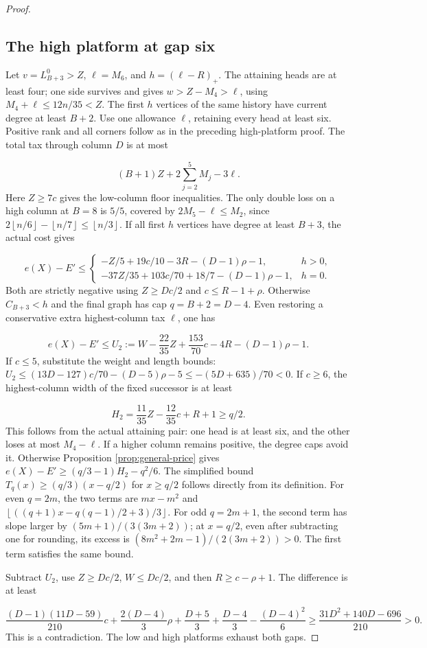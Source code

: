 \documentclass[11pt,a4paper]{article}
\newcommand{\floor}[1]{\left\lfloor#1\right\rfloor}
\theoremstyle{definition}
\begin{document}
\begin{proof}
\subsection*{The high platform at gap six}
Let $v=L_{B+3}^0>Z$, $\ell=M_6$, and $h=(\ell-R)_+$.
The attaining heads are at least four; one side survives and gives
$w>Z-M_4>\ell$, using $M_4+\ell\le12n/35<Z$.
The first $h$ vertices of the same history have current degree at least $B+2$.
Use one allowance $\ell$, retaining every head at least six.
Positive rank and all corners follow as in the preceding high-platform proof.
The total tax through column $D$ is at most

\[
(B+1)Z+2\sum_{j=2}^{5}M_j-3\ell .
\]
Here $Z\ge7c$ gives the low-column floor inequalities.
The only double loss on a high column at $B=8$ is $5/5$,
covered by $2M_5-\ell\le M_2$, since
$2\floor{n/6}-\floor{n/7}\le\floor{n/3}$.
If all first $h$ vertices have degree at least $B+3$, the actual cost gives

\[
e(X)-E'\le
\begin{cases}
-Z/5+19c/10-3R-(D-1)\rho-1,&h>0,\\
-37Z/35+103c/70+18/7-(D-1)\rho-1,&h=0 .
\end{cases}
\]
Both are strictly negative using $Z\ge Dc/2$ and $c\le R-1+\rho$.
Otherwise $C_{B+3}<h$ and the final graph has cap $q=B+2=D-4$.
Even restoring a conservative extra highest-column tax $\ell$, one has

\[
e(X)-E'\le U_2
 :=W-\frac{22}{35}Z+\frac{153}{70}c-4R-(D-1)\rho-1.
\]
If $c\le5$, substitute the weight and length bounds:
$U_2\le(13D-127)c/70-(D-5)\rho-5\le-(5D+635)/70<0$.
If $c\ge6$, the highest-column width of the fixed successor is at least

\[
H_2=\frac{11}{35}Z-\frac{12}{35}c+R+1\ge q/2.
\]
This follows from the actual attaining pair: one head is at least six,
and the other loses at most $M_4-\ell$.
If a higher column remains positive, the degree caps avoid it.
Otherwise Proposition \ref{prop:general-price} gives
$e(X)-E'\ge(q/3-1)H_2-q^2/6$.
The simplified bound $T_q(x)\ge(q/3)(x-q/2)$ for $x\ge q/2$
follows directly from its definition.
For even $q=2m$, the two terms are $mx-m^2$ and
$\floor{((q+1)x-q(q-1)/2+3)/3}$.
For odd $q=2m+1$, the second term has slope larger by
$(5m+1)/(3(3m+2))$; at $x=q/2$, even after subtracting one for rounding,
its excess is $(8m^2+2m-1)/(2(3m+2))>0$.
The first term satisfies the same bound.

Subtract $U_2$, use $Z\ge Dc/2$, $W\le Dc/2$, and then $R\ge c-\rho+1$.
The difference is at least

\[
\frac{(D-1)(11D-59)}{210}c+
\frac{2(D-4)}3\rho+
\frac{D+5}{3}+\frac{D-4}{3}-\frac{(D-4)^2}{6}
\ge\frac{31D^2+140D-696}{210}>0.
\]
This is a contradiction. The low and high platforms exhaust both gaps.
\end{proof}
\end{document}
